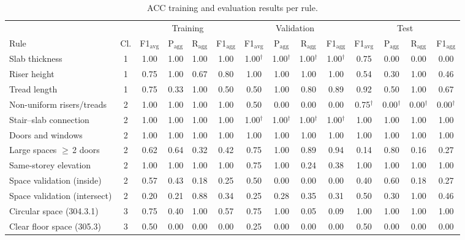 \begin{table}[t]
\centering
\caption{ACC training and evaluation results per rule.}
\label{tab:acc_results}
\small
\begin{tabular}{l c | cccc | cccc | cccc}
\toprule
 & & \multicolumn{4}{c|}{Training} & \multicolumn{4}{c|}{Validation} & \multicolumn{4}{c}{Test} \\
Rule & Cl. & F1$_\text{avg}$ & P$_\text{agg}$ & R$_\text{agg}$ & F1$_\text{agg}$ & F1$_\text{avg}$ & P$_\text{agg}$ & R$_\text{agg}$ & F1$_\text{agg}$ & F1$_\text{avg}$ & P$_\text{agg}$ & R$_\text{agg}$ & F1$_\text{agg}$ \\
\midrule
Slab thickness & 1 & 1.00 & 1.00 & 1.00 & 1.00 & 1.00$^\dagger$ & 1.00$^\dagger$ & 1.00$^\dagger$ & 1.00$^\dagger$ & 0.75 & 0.00 & 0.00 & 0.00 \\
Riser height & 1 & 0.75 & 1.00 & 0.67 & 0.80 & 1.00 & 1.00 & 1.00 & 1.00 & 0.54 & 0.30 & 1.00 & 0.46 \\
Tread length & 1 & 0.75 & 0.33 & 1.00 & 0.50 & 0.50 & 1.00 & 0.80 & 0.89 & 0.92 & 0.50 & 1.00 & 0.67 \\
\midrule
Non-uniform risers/treads & 2 & 1.00 & 1.00 & 1.00 & 1.00 & 0.50 & 0.00 & 0.00 & 0.00 & 0.75$^\dagger$ & 0.00$^\dagger$ & 0.00$^\dagger$ & 0.00$^\dagger$ \\
Stair--slab connection & 2 & 1.00 & 1.00 & 1.00 & 1.00 & 1.00$^\dagger$ & 1.00$^\dagger$ & 1.00$^\dagger$ & 1.00$^\dagger$ & 1.00 & 1.00 & 1.00 & 1.00 \\
Doors and windows & 2 & 1.00 & 1.00 & 1.00 & 1.00 & 1.00 & 1.00 & 1.00 & 1.00 & 1.00 & 1.00 & 1.00 & 1.00 \\
Large spaces $\geq$\,2 doors & 2 & 0.62 & 0.64 & 0.32 & 0.42 & 0.75 & 1.00 & 0.89 & 0.94 & 0.14 & 0.80 & 0.16 & 0.27 \\
Same-storey elevation & 2 & 1.00 & 1.00 & 1.00 & 1.00 & 0.75 & 1.00 & 0.24 & 0.38 & 1.00 & 1.00 & 1.00 & 1.00 \\
Space validation (inside) & 2 & 0.57 & 0.43 & 0.18 & 0.25 & 0.50 & 0.00 & 0.00 & 0.00 & 0.40 & 0.60 & 0.18 & 0.27 \\
Space validation (intersect) & 2 & 0.20 & 0.21 & 0.88 & 0.34 & 0.25 & 0.28 & 0.35 & 0.31 & 0.50 & 0.30 & 1.00 & 0.46 \\
\midrule
Circular space (304.3.1) & 3 & 0.75 & 0.40 & 1.00 & 0.57 & 0.75 & 1.00 & 0.05 & 0.09 & 1.00 & 1.00 & 1.00 & 1.00 \\
Clear floor space (305.3) & 3 & 0.50 & 0.00 & 0.00 & 0.00 & 0.25 & 0.00 & 0.00 & 0.00 & 0.50 & 0.00 & 0.00 & 0.00 \\

\end{tabular}
\end{table}
